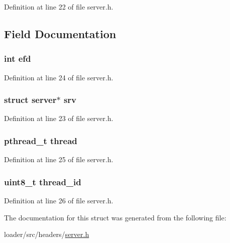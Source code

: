 Definition at line 22 of file server.\+h.



\subsection{Field Documentation}
\subsubsection[{\texorpdfstring{efd}{efd}}]{\setlength{\rightskip}{0pt plus 5cm}int efd}\hypertarget{structserver__worker_a1b04761ab401c558633d47581715bcf3}{}\label{structserver__worker_a1b04761ab401c558633d47581715bcf3}


Definition at line 24 of file server.\+h.

\subsubsection[{\texorpdfstring{srv}{srv}}]{\setlength{\rightskip}{0pt plus 5cm}struct {\bf server}$\ast$ srv}\hypertarget{structserver__worker_a1b6916fd6bd625513f86cc35333623c9}{}\label{structserver__worker_a1b6916fd6bd625513f86cc35333623c9}


Definition at line 23 of file server.\+h.

\subsubsection[{\texorpdfstring{thread}{thread}}]{\setlength{\rightskip}{0pt plus 5cm}pthread\+\_\+t thread}\hypertarget{structserver__worker_a01f75a9ad916f63a94e06a27635ba278}{}\label{structserver__worker_a01f75a9ad916f63a94e06a27635ba278}


Definition at line 25 of file server.\+h.

\subsubsection[{\texorpdfstring{thread\+\_\+id}{thread_id}}]{\setlength{\rightskip}{0pt plus 5cm}uint8\+\_\+t thread\+\_\+id}\hypertarget{structserver__worker_a2a8bb64b8b47a31561ece0650b3cdc6e}{}\label{structserver__worker_a2a8bb64b8b47a31561ece0650b3cdc6e}


Definition at line 26 of file server.\+h.



The documentation for this struct was generated from the following file\+:\begin{DoxyCompactItemize}
\item 
loader/src/headers/\hyperlink{server_8h}{server.\+h}\end{DoxyCompactItemize}
